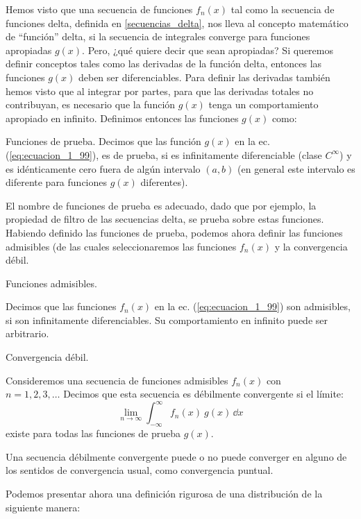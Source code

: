 Hemos visto que una secuencia de funciones $f_{n}(x)$ tal como la secuencia de funciones delta, definida en \ref{secuencias_delta}, nos lleva al concepto matemático de \enquote{función} delta, si la secuencia de integrales converge para funciones apropiadas $g(x)$. Pero, ¿qué quiere decir que sean apropiadas? Si queremos definir conceptos tales como las derivadas de la función delta, entonces las funciones $g(x)$ deben ser diferenciables. Para definir las derivadas también hemos visto que al integrar por partes, para que las derivadas totales no contribuyan, es necesario que la función $g(x)$ tenga un comportamiento apropiado en infinito. Definimos entonces las funciones $g(x)$ como:
\begin{defi}
Funciones de prueba.
Decimos que las función $g(x)$ en la ec. (\ref{eq:ecuacion_1_99}), es de prueba, si es infinitamente diferenciable (clase $C^{\infty}$) y es idénticamente cero fuera de algún intervalo $(a, b)$ (en general este intervalo es diferente para funciones $g(x)$ diferentes).
\end{defi}
El nombre de funciones de prueba es adecuado, dado que por ejemplo, la propiedad de filtro de las secuencias delta, se prueba sobre estas funciones. Habiendo definido las funciones de prueba, podemos ahora definir las funciones admisibles (de las cuales seleccionaremos las funciones $f_{n}(x)$ y la convergencia débil.
\begin{defi}
Funciones admisibles.

Decimos que las funciones $f_{n}(x)$ en la ec. (\ref{eq:ecuacion_1_99}) son admisibles, si son infinitamente diferenciables. Su comportamiento en infinito puede ser arbitrario.
\end{defi}
\begin{defi}
Convergencia débil.

Consideremos una secuencia de funciones admisibles $f_{n}(x)$ con \\ $n = 1, 2, 3, \ldots$
Decimos que esta secuencia es débilmente convergente si el límite:
\begin{equation}
\lim_{n \to \infty} \int_{-\infty}^{\infty} f_{n}(x) \:  g(x) \, \dd{x}
\label{eq:ecuacion_1_100}
\end{equation}
existe para todas las funciones de prueba $g(x)$.
\end{defi}
Una secuencia débilmente convergente puede o no puede converger en alguno de los sentidos de convergencia usual, como convergencia puntual.
\par
Podemos presentar ahora una definición rigurosa de una distribución de la siguiente manera:
